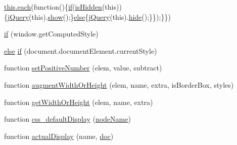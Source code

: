 \begin{DoxyCompactItemize}
\hyperlink{packages_2j_query_81_810_82_2_content_2_scripts_2jquery-1_810_82_8min_8js_af24c9ea1e34372f8c8b312b35586008d}{this.\+each}(function()\{\hyperlink{packages_2_respond_81_82_80_2content_2_scripts_2respond_8min_8js_a93851d60dd037a83509a1757b9ee7b66}{if}(\hyperlink{packages_2j_query_81_810_82_2_content_2_scripts_2jquery-1_810_82_8js_a67ed58d688ff11991ca2826ebfbf28a4}{is\+Hidden}(this))\{\hyperlink{packages_2j_query_81_810_82_2_content_2_scripts_2jquery-1_810_82_8js_a5e01048fbd3a30b44e8d491d8945c457}{j\+Query}(this).\hyperlink{jquery-1_810_82-vsdoc_8js_a8dcdb81268297f0ecf76be5e6aebd05c}{show}();\}\hyperlink{packages_2j_query_8_validation_81_811_81_2_content_2_scripts_2jquery_8validate_8js_a0544c3fe466e421738dae463968b70ba}{else}\{\hyperlink{packages_2j_query_81_810_82_2_content_2_scripts_2jquery-1_810_82_8js_a5e01048fbd3a30b44e8d491d8945c457}{j\+Query}(this).\hyperlink{jquery-1_810_82-vsdoc_8js_ab184a969b4c8542290dae744d90fd4d2}{hide}();\}\});\}\})
\item 
\hyperlink{_bibabook_2_scripts_2jquery-1_810_82_8js_add3620f254b483a46b557fde577ecbf7}{if} (window.\+get\+Computed\+Style)
\item 
\hyperlink{packages_2j_query_8_validation_81_811_81_2_content_2_scripts_2jquery_8validate_8js_a0544c3fe466e421738dae463968b70ba}{else} \hyperlink{_bibabook_2_scripts_2jquery-1_810_82_8js_ac118b48e1947a1d7c85fefbdad49502e}{if} (document.\+document\+Element.\+current\+Style)
\item 
function \hyperlink{_bibabook_2_scripts_2jquery-1_810_82_8js_a049182834e8b4b2d7485cd919ed272d7}{set\+Positive\+Number} (elem, value, subtract)
\item 
function \hyperlink{_bibabook_2_scripts_2jquery-1_810_82_8js_aacaac1f0b5ea53030522e6f5b227ce51}{augment\+Width\+Or\+Height} (elem, name, extra, is\+Border\+Box, styles)
\item 
function \hyperlink{_bibabook_2_scripts_2jquery-1_810_82_8js_a6520fbbeac78eeb0f519393470dc873b}{get\+Width\+Or\+Height} (elem, name, extra)
\item 
function \hyperlink{_bibabook_2_scripts_2jquery-1_810_82_8js_a90f91be23732240774f2a323d500c78a}{css\+\_\+default\+Display} (\hyperlink{jquery-1_810_82-vsdoc_8js_a269e960a03eef49b8ed3a84932c1334d}{node\+Name})
\item 
function \hyperlink{_bibabook_2_scripts_2jquery-1_810_82_8js_a88bc5a80e40ccc594ece17ae5772d5d3}{actual\+Display} (name, \hyperlink{packages_2_respond_81_82_80_2content_2_scripts_2respond_8js_a8375eceb3a4b59a36700e7fc468e8983}{doc})
\item 

\end{DoxyCompactItemize}
